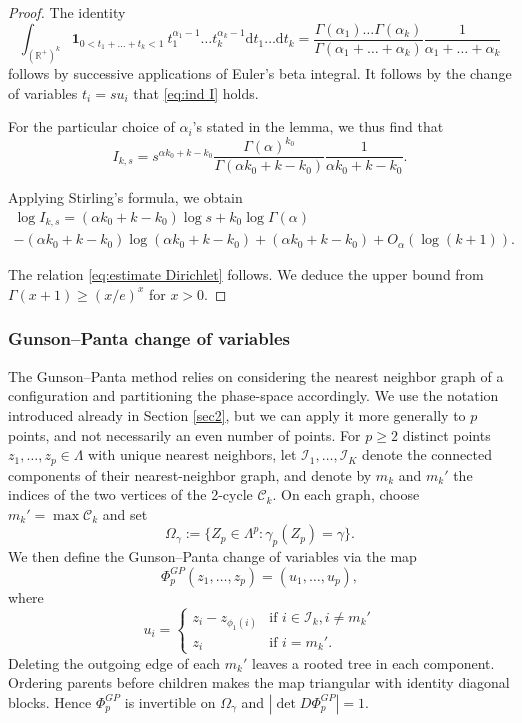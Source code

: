 \documentclass[a4paper,10pt,leqno]{amsart}
\numberwithin{equation}{section}
\newcommand{\R}{\mathbb{R}}
\newcommand{\dd}{\mathrm{d}}
\def\indic{\mathbf{1}}
\begin{document}
\begin{proof}
  The identity
  \begin{equation*}\int_{(\R^+)^k} \indic_{0<t_1+\ldots+t_k<1 }\ t_1^{\alpha_1-1}\ldots t_k^{\alpha_k-1}\dd t_1\ldots \dd t_k
    = \frac{\Gamma(\alpha_1)\ldots \Gamma(\alpha_k)}{\Gamma(\alpha_1+\ldots+\alpha_k)}\frac{1}{\alpha_1+\ldots+\alpha_k}\end{equation*}
  follows by successive applications of Euler's beta integral.
  It follows by the change of variables $t_i=s u_i$ that \eqref{eq:ind I} holds.

  For the particular choice of $\alpha_i$'s stated in the lemma, we thus find that
  \begin{equation*}
    I_{k,s}=s^{ \alpha k_0+k-k_0}\frac{\Gamma(\alpha)^{k_0}}{\Gamma(\alpha k_0+k-k_0)}\frac{1}{\alpha k_0+k-k_0}.
  \end{equation*}

  Applying Stirling's formula, we obtain
  \begin{multline*}\log I_{k,s}= (\alpha k_0+k-k_0)\log s+ k_0\log \Gamma(\alpha) \\ - (\alpha k_0+k-k_0) \log (\alpha k_0+k-k_0)+ (\alpha k_0+k-k_0)+O_\alpha(\log(k+1)).\end{multline*}

  The relation \eqref{eq:estimate Dirichlet} follows. We deduce the upper bound from $\Gamma(x+1)\ge(x/e)^x$ for $x>0$.\end{proof}

\subsubsection*{Gunson--Panta change of variables}
The Gunson--Panta method relies on considering the nearest neighbor graph of a configuration and partitioning the phase-space accordingly. We use the notation introduced already in Section \ref{sec2}, but we can apply it more generally to $p$ points, and not necessarily an even number of points.
For $p\ge2$ distinct points $z_1,\ldots,z_p\in\Lambda$ with unique nearest neighbors, let $\mathcal{I}_1, \dots , \mathcal{I}_K$ denote the connected components of their nearest-neighbor graph, and denote by $m_k$ and $m_k'$ the indices of the two vertices of the 2-cycle $\mathcal C_k$. On each graph, choose $m_k'=\max\mathcal C_k$ and set
\[
  \Omega_\gamma:=\{Z_p\in\Lambda^p:\gamma_p(Z_p)=\gamma\}.
\]
We then define the Gunson--Panta change of variables via the map
\begin{equation}\label{defphi}
  \Phi^{GP}_p (z_1, \dots, z_p) = (u_1, \dots, u_p),\end{equation} where
\begin{equation*}
  u_i=\left\{
  \begin{array}{ll}
    z_i-z_{\phi_1(i)} & \text{if }i\in \mathcal{I}_k,i\neq m_k' \\
    z_{i} & \text{if } i=m_k'.
  \end{array}
  \right.
\end{equation*}
Deleting the outgoing edge of each $m_k'$ leaves a rooted tree in each component. Ordering parents before children makes the map triangular with identity diagonal blocks. Hence $\Phi_p^{GP}$ is invertible on $\Omega_\gamma$ and $|\det D\Phi_p^{GP}|=1$.
\end{document}
